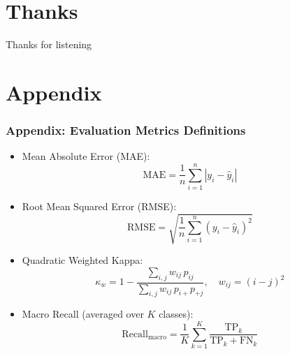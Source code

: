 \documentclass[aspectratio=169]{beamer}
\begin{document}
\section{Thanks}

\begin{frame}[plain]
    \begin{center}
        \vfill
        {\Huge Thanks for listening}
        \vfill
    \end{center}
\end{frame}


\section{Appendix}

\begin{frame}
    \frametitle{Appendix: Evaluation Metrics Definitions}
    \small{
    \begin{itemize}
        \item Mean Absolute Error (MAE):
        \begin{equation*}
            \text{MAE} = \frac{1}{n} \sum_{i=1}^{n} |y_i - \hat{y}_i|
        \end{equation*}
        \item Root Mean Squared Error (RMSE):
        \begin{equation*}
            \text{RMSE} = \sqrt{\frac{1}{n} \sum_{i=1}^{n} (y_i - \hat{y}_i)^2}
        \end{equation*}
        \item Quadratic Weighted Kappa:
        \begin{equation*}
            \kappa_w = 1 - \frac{\sum_{i,j} w_{ij} \, p_{ij}}{\sum_{i,j} w_{ij} \, p_{i+} p_{+j}}, \quad w_{ij} = (i - j)^2
        \end{equation*}
        \item Macro Recall (averaged over $K$ classes):
        \begin{equation*}
            \text{Recall}_{\text{macro}} = \frac{1}{K} \sum_{k=1}^{K} \frac{\text{TP}_k}{\text{TP}_k + \text{FN}_k}
        \end{equation*}
    \end{itemize}
    }
\end{frame}
\end{document}
